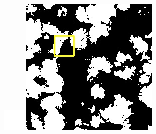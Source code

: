 \documentclass[10pt]{ctexart}
\begin{document}
\begin{multicols}{2}
\begin{figure}[H]
{\begin{minipage}[b]{0.15\linewidth}
            \includegraphics[width=1\linewidth]{../log/spoon2/cut/tmp_cut_LC81321192014054LGN00_03055_my.jpg}\vspace{4pt}
            \includegraphics[width=1\linewidth]{../log/spoon2/cut/LC80350192014190LGN00_06561_my.jpg}\vspace{4pt}

\end{minipage}}
\end{figure}
\end{multicols}
\end{document}
